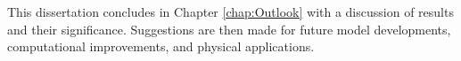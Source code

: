 
This dissertation concludes in Chapter \ref{chap:Outlook} with a discussion of results and their significance. Suggestions are then made for future model developments, computational improvements, and physical applications.
